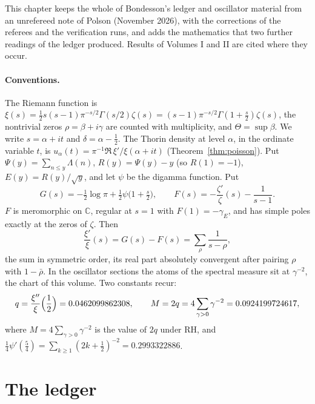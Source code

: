 \label{bo:ch:ledger}
\providecommand{\dd}{\mathrm{d}}

This chapter keeps the whole of Bondesson's ledger and oscillator material from an unrefereed note of Polson (November 2026), with the corrections of the referees and the verification runs, and adds the mathematics that two further readings of the ledger produced. Results of Volumes I and II are cited where they occur.

\paragraph{Conventions.} The Riemann function is $\xi(s)=\frac12s(s-1)\pi^{-s/2}\Gamma(s/2)\zeta(s)=(s-1)\pi^{-s/2}\Gamma(1+\frac s2)\zeta(s)$, the nontrivial zeros $\rho=\beta+i\gamma$ are counted with multiplicity, and $\Theta=\sup\beta$. We write $s=\alpha+it$ and $\delta=\alpha-\frac12$. The Thorin density at level $\alpha$, in the ordinate variable $t$, is $u_\alpha(t)=\pi^{-1}\Re\,\xi'/\xi(\alpha+it)$ (Theorem~\ref{thm:poisson}). Put $\Psi(y)=\sum_{n\le y}\Lambda(n)$, $R(y)=\Psi(y)-y$ (so $R(1)=-1$), $E(y)=R(y)/\sqrt y$, and let $\psi$ be the digamma function. Put
\[
G(s)=-\tfrac12\log\pi+\tfrac12\psi\bigl(1+\tfrac s2\bigr),\qquad F(s)=-\frac{\zeta'}{\zeta}(s)-\frac1{s-1}.
\]
$F$ is meromorphic on $\mathbb C$, regular at $s=1$ with $F(1)=-\gamma_E$, and has simple poles exactly at the zeros of $\zeta$. Then
\begin{equation}\label{bo:eq:xi}
\frac{\xi'}{\xi}(s)=G(s)-F(s)=\sum_\rho\frac1{s-\rho},
\end{equation}
the sum in symmetric order, its real part absolutely convergent after pairing $\rho$ with $1-\bar\rho$. In the oscillator sections the atoms of the spectral measure sit at $\gamma^{-2}$, the chart of this volume. Two constants recur:
\[
q=\frac{\xi''}{\xi}\Bigl(\frac12\Bigr)=0.0462099862308,\qquad M=2q=4\sum_{\gamma>0}\gamma^{-2}=0.0924199724617,
\]
where $M=4\sum_{\gamma>0}\gamma^{-2}$ is the value of $2q$ under RH, and $\frac14\psi'(\frac54)=\sum_{k\ge1}(2k+\frac12)^{-2}=0.2993322886$.

\section{The ledger}\label{bo:sec:ledger}

